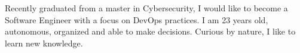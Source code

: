 
\begin{cvparagraph}
    Recently graduated from a master in Cybersecurity, I would like to become a Software Engineer with a focus on DevOps practices. 
    I am 23 years old, autonomous, organized and able to make decisions. Curious by nature, I like to learn new knowledge.
\end{cvparagraph}
